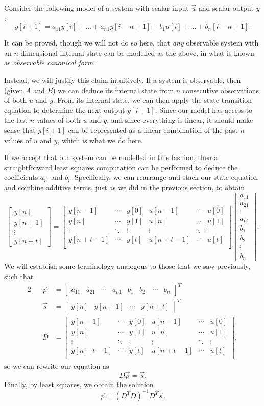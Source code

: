 \documentclass[letterpaper]{article}
\theoremstyle{remark}
\newcommand{\mat}[1]{\ensuremath{\begin{bmatrix}#1\end{bmatrix}}}
\newcommand{\eqn}[1]{\begin{alignat*}{2}#1\end{alignat*}}
\begin{document}
Consider the following model of a system with scalar input $\vec{u}$ and scalar output $y$:
\[
    y[i + 1] = a_{11}y[i] + \ldots + a_{n1}y[i - n + 1] + b_1u[i] + \ldots + b_n[i - n + 1].
\]

It can be proved, though we will not do so here, that \emph{any} observable system with an $n$-dimensional internal state can be modelled as the above, in what is known as \emph{observable canonical form}. 

Instead, we will justify this claim intuitively. If a system is observable, then (given $A$ and $B$) we can deduce its internal state from $n$ consecutive observations of both $u$ and $y$. From its internal state, we can then apply the state transition equation to determine the next output $y[i+1]$. Since our model has access to the last $n$ values of both $u$ and $y$, and since everything is linear, it should make sense that $y[i+1]$ can be represented as a linear combination of the past $n$ values of $u$ and $y$, which is what we do here.

If we accept that our system can be modelled in this fashion, then a straightforward least squares computation can be performed to deduce the coefficients $a_{i1}$ and $b_i$. Specifically, we can rearrange and stack our state equation and combine additive terms, just as we did in the previous section, to obtain
\[
    \mat{y[n] \\ y[n+1] \\ \vdots \\ y[n+t]} = 
    \mat{
    y[n - 1] & \cdots & y[0] & u[n - 1] & \cdots & u[0] \\
    y[n] & \cdots & y[1] & u[n] & \cdots & u[1] \\
    \vdots & \ddots & \vdots & \vdots & \ddots & \vdots \\
    y[n + t - 1] & \cdots & y[t] & u[n + t - 1] & \cdots & u[t] \\
    }
    \mat{a_{11} \\ a_{21} \\ \vdots \\ a_{n1} \\ b_1 \\ b_2 \\ \vdots \\ b_n}.
\]
We will establish some terminology analogous to those that we saw previously, such that
\eqn{
    && \vec{p} &= \mat{a_{11} & a_{21} & \cdots & a_{n1} & b_1 & b_2 &\ \cdots & b_n}^T \\
    && \vec{s} &= \mat{y[n] & y[n+1] & \cdots & y[n+t]}^T \\
    && D &= \mat{
    y[n - 1] & \cdots & y[0] & u[n - 1] & \cdots & u[0] \\
    y[n] & \cdots & y[1] & u[n] & \cdots & u[1] \\
    \vdots & \ddots & \vdots & \vdots & \ddots & \vdots \\
    y[n + t - 1] & \cdots & y[t] & u[n + t - 1] & \cdots & u[t] \\
    },
}
so we can rewrite our equation as
\[
    D\vec{p} = \vec{s}.
\]
Finally, by least squares, we obtain the solution
\[
    \vec{p} = (D^TD)^{-1}D^T\vec{s}.
\]
\end{document}
